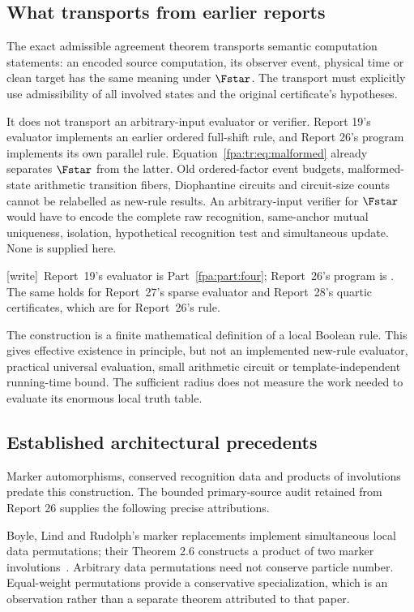 \documentclass[11pt,a4paper]{article}
\numberwithin{equation}{section}
\newcommand{\wtag}{\textup{[write]}}
\begin{document}
\subsection{What transports from earlier reports}
The exact admissible agreement theorem transports semantic computation statements: an encoded source computation, its observer event, physical time or clean target has the same meaning under $\Fstar$. The transport must explicitly use admissibility of all involved states and the original certificate's hypotheses.

It does not transport an arbitrary-input evaluator or verifier. Report 19's evaluator implements an earlier ordered full-shift rule, and Report 26's program implements its own parallel rule. Equation~\eqref{fpa:tr:eq:malformed} already separates $\Fstar$ from the latter. Old ordered-factor event budgets, malformed-state arithmetic transition fibers, Diophantine circuits and circuit-size counts cannot be relabelled as new-rule results. An arbitrary-input verifier for $\Fstar$ would have to encode the complete raw recognition, same-anchor mutual uniqueness, isolation, hypothetical recognition test and simultaneous update. None is supplied here.

\wtag\ Report~19's evaluator is Part~\ref{fpa:part:four}; Report~26's program is . The same holds for Report~27's sparse evaluator and Report~28's quartic certificates, which are for Report~26's rule.

The construction is a finite mathematical definition of a local Boolean rule. This gives effective existence in principle, but not an implemented new-rule evaluator, practical universal evaluation, small arithmetic circuit or template-independent running-time bound. The sufficient radius does not measure the work needed to evaluate its enormous local truth table.

\subsection{Established architectural precedents}
Marker automorphisms, conserved recognition data and products of involutions predate this construction. The bounded primary-source audit retained from Report 26 supplies the following precise attributions.

Boyle, Lind and Rudolph's marker replacements implement simultaneous local data permutations; their Theorem 2.6 constructs a product of two marker involutions~\cite{fpa:blr}. Arbitrary data permutations need not conserve particle number. Equal-weight permutations provide a conservative specialization, which is an observation rather than a separate theorem attributed to that paper.
\end{document}
